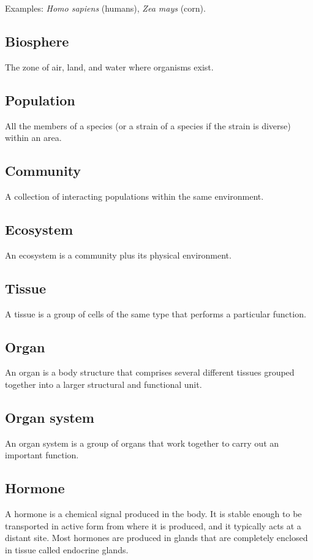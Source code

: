 \documentclass[11pt]{article}
\begin{document}
Examples: \emph{Homo sapiens} (humans), \emph{Zea mays} (corn).

\subsection{Biosphere}
\label{sec:org50e86b1}
The zone of air, land, and water where organisms exist.

\subsection{Population}
\label{sec:org37835b9}
All the members of a species (or a strain of a species if the strain is diverse) within an area.

\subsection{Community}
\label{sec:orgdaad145}
A collection of interacting populations within the same environment.

\subsection{Ecosystem}
\label{sec:org171fc7a}
An ecosystem is a community plus its physical environment.

\subsection{Tissue}
\label{sec:org1114619}
A tissue is a group of cells of the same type that performs a particular function.

\subsection{Organ}
\label{sec:orgf14ceba}
An organ is a body structure that comprises several different tissues grouped together into a larger structural and functional unit.

\subsection{Organ system}
\label{sec:orgb2261d7}
An organ system is a group of organs that work together to carry out an important function.

\subsection{Hormone}
\label{sec:org444c7c0}
A hormone is a chemical signal produced in the body. It is stable enough to be transported in active form from where it is produced, and it typically acts at a distant site. Most hormones are produced in glands that are completely enclosed in tissue called endocrine glands.
\end{document}
